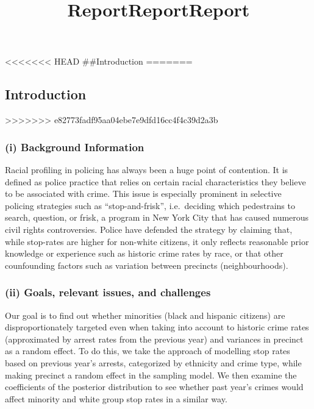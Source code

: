 \documentclass[]{article}
\title{Report}
\author{}
\date{}
\title{Report}
\date{}
\title{Report}
\author{}
\date{\vspace{-2.5em}}
\begin{document}
\maketitle

<<<<<<< HEAD
\#\#Introduction
=======
\hypertarget{introduction}{%
\subsection{Introduction}\label{introduction}}
>>>>>>> e82773fadf95aa04ebe7e9dfd16cc4f4c39d2a3b

\hypertarget{i-background-information}{%
\subsubsection{(i) Background
Information}\label{i-background-information}}

Racial profiling in policing has always been a huge point of contention.
It is defined as police practice that relies on certain racial
characteristics they believe to be associated with crime. This issue is
especially prominent in selective policing strategies such as
``stop-and-frisk'', i.e.~deciding which pedestrains to search, question,
or frisk, a program in New York City that has caused numerous civil
rights controversies. Police have defended the strategy by claiming
that, while stop-rates are higher for non-white citizens, it only
reflects reasonable prior knowledge or experience such as historic crime
rates by race, or that other counfounding factors such as variation
between precincts (neighbourhoods).

\hypertarget{ii-goals-relevant-issues-and-challenges}{%
\subsubsection{(ii) Goals, relevant issues, and
challenges}\label{ii-goals-relevant-issues-and-challenges}}

Our goal is to find out whether minorities (black and hispanic citizens)
are disproportionately targeted even when taking into account to
historic crime rates (approximated by arrest rates from the previous
year) and variances in precinct as a random effect. To do this, we take
the approach of modelling stop rates based on previous year's arrests,
categorized by ethnicity and crime type, while making precinct a random
effect in the sampling model. We then examine the coefficients of the
posterior distribution to see whether past year's crimes would affect
minority and white group stop rates in a similar way.
\end{document}
